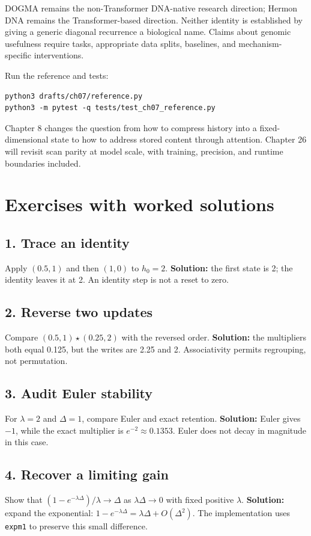 DOGMA remains the non-Transformer DNA-native research direction;
Hermon DNA remains the Transformer-based direction. Neither identity
is established by giving a generic diagonal recurrence a biological name.
Claims about genomic usefulness require tasks, appropriate data splits,
baselines, and mechanism-specific interventions.

Run the reference and tests:
\begin{Verbatim}[fontsize=\small]
python3 drafts/ch07/reference.py
python3 -m pytest -q tests/test_ch07_reference.py
\end{Verbatim}
Chapter 8 changes the question from how to compress history into a
fixed-dimensional state to how to address stored content through attention.
Chapter 26 will revisit scan parity at model scale, with training,
precision, and runtime boundaries included.

\section{Exercises with worked solutions}

\subsection*{1. Trace an identity}
Apply $(0.5,1)$ and then $(1,0)$ to $h_0=2$.
\textbf{Solution:} the first state is 2; the identity leaves it at 2.
An identity step is not a reset to zero.

\subsection*{2. Reverse two updates}
Compare $(0.5,1)\star(0.25,2)$ with the reversed order.
\textbf{Solution:} the multipliers both equal 0.125, but the writes
are 2.25 and 2. Associativity permits regrouping, not permutation.

\subsection*{3. Audit Euler stability}
For $\lambda=2$ and $\Delta=1$, compare Euler and exact retention.
\textbf{Solution:} Euler gives $-1$, while the exact multiplier is
$e^{-2}\approx0.1353$. Euler does not decay in magnitude in this case.

\subsection*{4. Recover a limiting gain}
Show that $(1-e^{-\lambda\Delta})/\lambda\to\Delta$ as
$\lambda\Delta\to0$ with fixed positive $\lambda$.
\textbf{Solution:} expand the exponential:
$1-e^{-\lambda\Delta}=\lambda\Delta+O(\Delta^2)$.
The implementation uses \texttt{expm1} to preserve this small difference.

